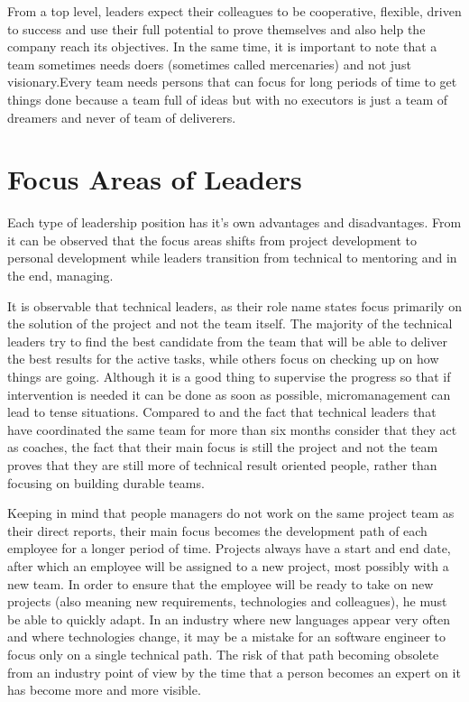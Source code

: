 From a top level, leaders expect their colleagues to be cooperative, flexible, driven to success and use their full potential to prove themselves and also help the company reach its objectives. In the same time, it is important to note that a team sometimes needs doers (sometimes called mercenaries) and not just visionary.Every team needs persons that can focus for long periods of time to get things done because a team full of ideas but with no executors is just a team of dreamers and never of team of deliverers.

\section{Focus Areas of Leaders}
\label{sec:focus}
Each type of leadership position has it's own advantages and disadvantages. From  it can be observed that the focus areas shifts from project development to personal development while leaders transition from technical to mentoring and in the end, managing.

It is observable that technical leaders, as their role name states focus primarily on the solution of the project and not the team itself. The majority of the technical leaders try to find the best candidate from the team that will be able to deliver the best results for the active tasks, while others focus on checking up on how things are going. Although it is a good thing to supervise the progress so that if intervention is needed it can be done as soon as possible, micromanagement can lead to tense situations. Compared to  and the fact that technical leaders that have coordinated the same team for more than six months consider that they act as coaches, the fact that their main focus is still the project and not the team proves that they are still more of technical result oriented people, rather than focusing on building durable teams.

Keeping in mind that people managers do not work on the same project team as their direct reports, their main focus becomes the development path of each employee for a longer period of time. Projects always have a start and end date, after which an employee will be assigned to a new project, most possibly with a new team. In order to ensure that the employee will be ready to take on new projects (also meaning new requirements, technologies and colleagues), he must be able to quickly adapt. In an industry where new languages appear very often and where technologies change, it may be a mistake for an software engineer to focus only on a single technical path. The risk of that path becoming obsolete from an industry point of view by the time that a person becomes an expert on it has become more and more visible.

